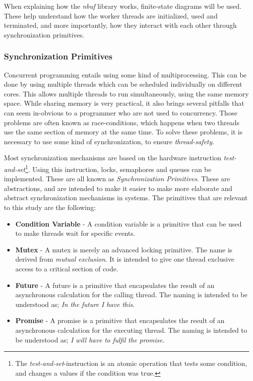 \documentclass[a4paper]{article}
\newcommand{\nbuf}{\textit{nbuf} }
\begin{document}
When explaining how the \nbuf library works, finite-state diagrams will be used. These help understand how the worker threads are initialized, used and terminated, and more importantly, how they interact with each other through synchronization primitives.


\subsubsection{Synchronization Primitives}
Concurrent programming entails using some kind of multiprocessing. This can be done by using multiple threads which can be scheduled individually on different cores. This allows multiple threads to run simultaneously, using the same memory space. While sharing memory is very practical, it also brings several pitfalls that can seem in-obvious to a programmer who are not used to concurrency. Those problems are often known as race-conditions, which happens when two threads use the same section of memory at the same time. To solve these problems, it is necessary to use some kind of synchronization, to ensure \textit{thread-safety}.

Most synchronization mechanisms are based on the hardware instruction \textit{test-and-set}\footnote{The \textit{test-and-set}-instruction is an atomic operation that tests some condition, and changes a values if the condition was true.}. Using this instruction, locks, semaphores and queues can be implemented. These are all known as \textit{Synchronization Primitives}. These are abstractions, and are intended to make it easier to make more elaborate and abstract synchronization mechanisms in systems. The primitives that are relevant to this study are the following:

\begin{itemize}
\item \textbf{Condition Variable} - A condition variable is a primitive that can be used to make threads wait for specific events.
\item \textbf{Mutex} - A mutex is merely an advanced locking primitive. The name is derived from \textit{mutual exclusion}. It is intended to give one thread exclusive access to a critical section of code.
\item \textbf{Future} - A future is a primitive that encapsulates the result of an asynchronous calculation for the calling thread. The naming is intended to be understood as; \textit{In the future I have this}.
\item \textbf{Promise} - A promise is a primitive that encapsulates the result of an asynchronous calculation for the executing thread. The naming is intended to be understood as; \textit{I will have to fulfil the promise}.
\end{itemize}
\end{document}
